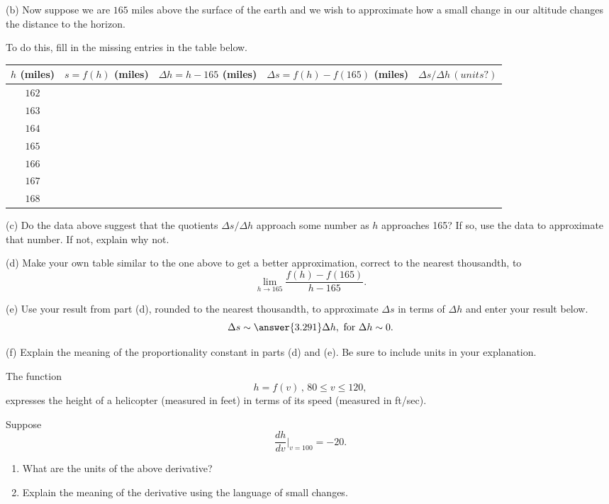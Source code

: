 \documentclass{ximera}
\begin{document}
\begin{question}
(b) Now suppose we are $165$ miles above the surface of the earth and we wish to approximate how a small change in our altitude changes the distance to the horizon.

To do this, fill in the missing entries in the table below.

\begin{center}
  \begin{tabular}{ | c| c | c | c | c |}
    \hline
    $h$ (miles) & $s = f(h)$ (miles) & $\Delta h = h-165$ (miles)  & $\Delta s =f(h) - f(165)$ (miles) & $\Delta s/\Delta h \, (units?)$ \\ \hline
     $162$ &  &  &   & \\ \hline
    $163$ &  &  &   & \\ \hline
    $164$ &  &  &   &  \\ \hline
    $165$  &  &  &  &   \\ \hline
    $166$ &  &  &   &  \\ \hline
    $167$ &  &  &   &  \\ \hline
    $168$ &  &  &   &  \\ \hline
    \hline
  \end{tabular}
\end{center}

(c) Do the data above suggest that the quotients $\Delta s / \Delta h$ approach some number as $h$ approaches 165? If so, use the data to approximate that number. If not, explain why not.

(d) Make your own table similar to the one above to get a better approximation, correct to the nearest thousandth, to
\[
   \lim_{h\to 165} \frac{f(h) - f(165)}{h-165} .
\]


(e) Use your result from part (d), rounded to the nearest thousandth, to approximate $\Delta s$ in terms of $\Delta h$ and enter your result below.
\[
  \Delta s \sim \answer{3.291} \Delta h , \text{ for } \Delta h \sim 0.
\] 

(f) Explain the meaning of the proportionality constant in parts (d) and (e). Be sure to include units in your explanation.


\end{question}


\begin{question}  \label{Qdetrghhgfgd}
The function
\[
      h = f(v) \, , \, 80 \leq v \leq 120 ,
\]
expresses the height of a helicopter (measured in feet) in terms of its speed (measured in ft/sec).

Suppose
\[
   \frac{dh}{dv}\Big|_{v=100} = - 20 .
\] 

\begin{enumerate}
\item What are the units of the above derivative?

\item Explain the meaning of the derivative using the language of small changes.
\end{enumerate}

\end{question}
\end{document}
